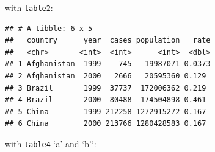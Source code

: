 \documentclass[]{book}
\newenvironment{Shaded}{\begin{snugshade}}{\end{snugshade}}
\newcommand{\DataTypeTok}[1]{\textcolor[rgb]{0.13,0.29,0.53}{#1}}
\newcommand{\DecValTok}[1]{\textcolor[rgb]{0.00,0.00,0.81}{#1}}
\newcommand{\KeywordTok}[1]{\textcolor[rgb]{0.13,0.29,0.53}{\textbf{#1}}}
\newcommand{\NormalTok}[1]{#1}
\newcommand{\OperatorTok}[1]{\textcolor[rgb]{0.81,0.36,0.00}{\textbf{#1}}}
\newcommand{\StringTok}[1]{\textcolor[rgb]{0.31,0.60,0.02}{#1}}
\theoremstyle{definition}
\theoremstyle{definition}
\theoremstyle{definition}
\theoremstyle{remark}
\begin{document}
with \texttt{table2}:

\begin{Shaded}
\end{Shaded}

\begin{verbatim}
## # A tibble: 6 x 5
##   country      year  cases population   rate
##   <chr>       <int>  <int>      <int>  <dbl>
## 1 Afghanistan  1999    745   19987071 0.0373
## 2 Afghanistan  2000   2666   20595360 0.129 
## 3 Brazil       1999  37737  172006362 0.219 
## 4 Brazil       2000  80488  174504898 0.461 
## 5 China        1999 212258 1272915272 0.167 
## 6 China        2000 213766 1280428583 0.167
\end{verbatim}

with \texttt{table4} `a' and `b'`:

\begin{Shaded}
\end{Shaded}
\end{document}
